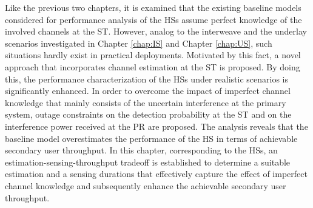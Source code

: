 Like the previous two chapters, it is examined that the existing baseline models considered for performance analysis of the HSs assume perfect knowledge of the involved channels at the ST. However, analog to the interweave and the underlay scenarios investigated in Chapter \ref{chap:IS} and Chapter \ref{chap:US}, such situations hardly exist in practical deployments. Motivated by this fact, a novel approach that incorporates channel estimation at the ST is proposed. By doing this, the performance characterization of the HSs under realistic scenarios is significantly enhanced. In order to overcome the impact of imperfect channel knowledge that mainly consists of the uncertain interference at the primary system, outage constraints on the detection probability at the ST and on the interference power received at the PR are proposed. The analysis reveals that the baseline model overestimates the performance of the HS in terms of achievable secondary user throughput. In this chapter, corresponding to the HSs, an estimation-sensing-throughput tradeoff is established to determine a suitable estimation and a sensing durations that effectively capture the effect of imperfect channel knowledge and subsequently enhance the achievable secondary user throughput. 

